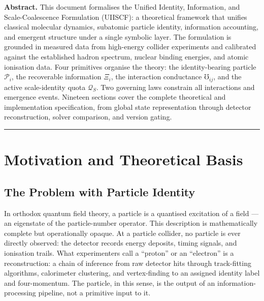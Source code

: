 \documentclass[11pt,a4paper]{article}
\newcommand{\Pid}{\mathscr{P}}
\newcommand{\Rec}{\Xi}
\newcommand{\Cond}{\mho}
\newcommand{\Quota}{\mathcal{Q}}
\begin{document}
\begin{center}
  \begin{minipage}{0.82\textwidth}
  \small\textbf{Abstract.}\quad
  This document formalises the Unified Identity, Information, and
  Scale-Coalescence Formulation (UIISCF): a theoretical framework that
  unifies classical molecular dynamics, subatomic particle identity,
  information accounting, and emergent structure under a single symbolic
  layer.  The formulation is grounded in measured data from high-energy
  collider experiments and calibrated against the established hadron spectrum,
  nuclear binding energies, and atomic ionisation data.  Four primitives
  organise the theory: the identity-bearing particle $\Pid_i$, the recoverable
  information $\Rec_i$, the interaction conductance $\Cond_{ij}$, and the
  active scale-identity quota $\Quota_S$.  Two governing laws constrain all
  interactions and emergence events.  Nineteen sections cover the complete
  theoretical and implementation specification, from global state representation
  through detector reconstruction, solver comparison, and version gating.
  \end{minipage}

  \vspace{0.9em}
  \noindent\rule{\textwidth}{1.2pt}
\end{center}

\newpage

\tableofcontents
\newpage

\section{Motivation and Theoretical Basis}\label{sec:motivation}

\subsection{The Problem with Particle Identity}

In orthodox quantum field theory, a particle is a quantised excitation of a
field --- an eigenstate of the particle-number operator.  This description is
mathematically complete but operationally opaque.  At a particle collider,
no particle is ever directly observed: the detector records energy deposits,
timing signals, and ionisation trails.  What experimenters call a ``proton''
or an ``electron'' is a reconstruction: a chain of inference from raw detector
hits through track-fitting algorithms, calorimeter clustering, and
vertex-finding to an assigned identity label and four-momentum.  The particle,
in this sense, is the output of an information-processing pipeline, not a
primitive input to it.
\end{document}
